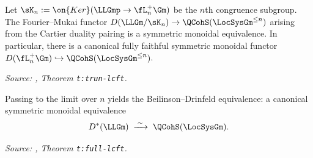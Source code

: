 \begin{theorem}
  \label{thm:trun-lcft}
  Let $\sK_n := \on{Ker}(\LLGmp \to \fL^+_n\Gm)$ be the $n$th congruence
  subgroup. The Fourier--Mukai functor
  $D(\LLGm/\sK_n) \to \QCohS(\LocSysGm^{\leq n})$ arising from the Cartier
  duality pairing is a symmetric monoidal equivalence. In particular, there
  is a canonical fully faithful symmetric monoidal functor
  $D(\fL^+_n\Gm) \hookrightarrow \QCohS(\LocSysGm^{\leq n})$.

  \textit{Source: \cite{hilburn-raskin}, Theorem \texttt{t:trun-lcft}.}
\end{theorem}

\begin{theorem}
  \label{thm:full-lcft}
  Passing to the limit over $n$ yields the Beilinson--Drinfeld equivalence: a
  canonical symmetric monoidal equivalence
  \[
    D^*(\LLGm) \;\xrightarrow{\;\sim\;}\; \QCohS(\LocSysGm).
  \]

  \textit{Source: \cite{hilburn-raskin}, Theorem \texttt{t:full-lcft}.}
\end{theorem}

